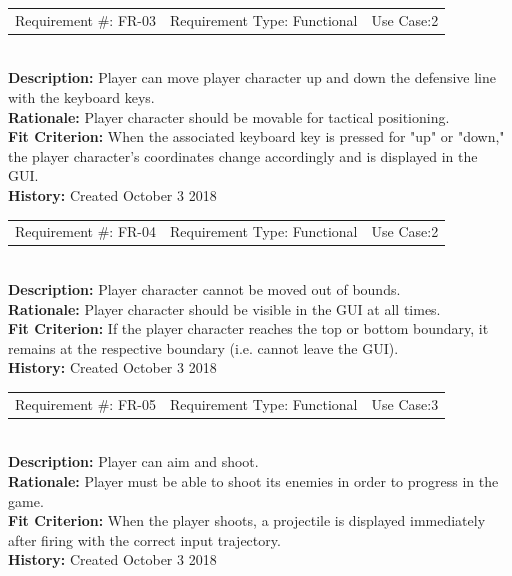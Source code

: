 \documentclass[12pt, titlepage]{article}
\begin{document}
\begin{reqbox}
	\begin{tabular}{c|c|c}
		Requirement \#: FR-03 & Requirement Type: Functional & Use Case:2 \\
	\end{tabular} \\
	\textbf{Description:} Player can move player character up and down the defensive line with the keyboard keys. \\
	\textbf{Rationale:}  Player character should be movable for tactical positioning. \\
	\textbf{Fit Criterion:} When the associated keyboard key is pressed for "up" or "down," the player character's coordinates change accordingly and is displayed in the GUI. \\
	\textbf{History:} Created October 3 2018
\end{reqbox}

\begin{reqbox}
	\begin{tabular}{c|c|c}
		Requirement \#: FR-04 & Requirement Type: Functional & Use Case:2 \\
	\end{tabular} \\
	\textbf{Description:} Player character cannot be moved out of bounds. \\
	\textbf{Rationale:}  Player character should be visible in the GUI at all times. \\
	\textbf{Fit Criterion:} If the player character reaches the top or bottom boundary, it remains at the respective boundary (i.e. cannot leave the GUI). \\
	\textbf{History:} Created October 3 2018
\end{reqbox}

\begin{reqbox}
	\begin{tabular}{c|c|c}
		Requirement \#: FR-05 & Requirement Type: Functional & Use Case:3 \\
	\end{tabular} \\
	\textbf{Description:} Player can aim and shoot. \\
	\textbf{Rationale:} Player must be able to shoot its enemies in order to progress in the game. \\
	\textbf{Fit Criterion:} When the player shoots, a projectile is displayed immediately after firing with the correct input trajectory. \\
	\textbf{History:} Created October 3 2018
\end{reqbox}
\end{document}
